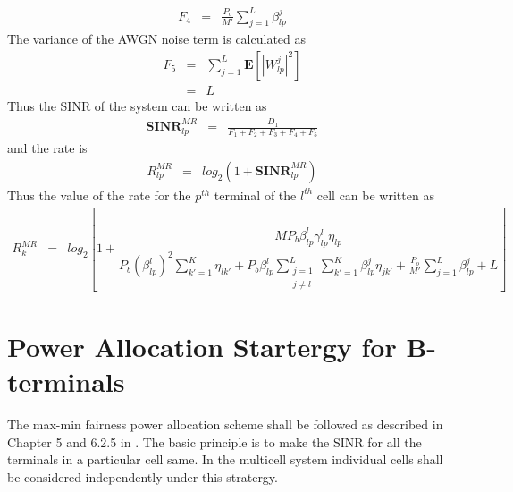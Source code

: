 \documentclass[10pt, a4paper, twoside,fleqn]{article}
\begin{document}
\begin{eqnarray}\label{eqn:noiseF4}
	F_4 &=& \frac{P_o}{M'}\sum_{j=1}^{L}\beta_{lp}^{j}
\end{eqnarray}
The variance of the AWGN noise term is calculated as 
\begin{eqnarray}\label{eqn:noiseF5}
	F_5 &=& \sum_{j=1}^{L} \mathbf{E}\left[|W_{lp}^{j}|^2\right] \nonumber \\
            &=& L
\end{eqnarray}
Thus the SINR of the system can be written as 
\begin{eqnarray}\label{eqn:sinrexp}
	\mathbf{SINR}_{lp}^{MR} &=& \frac{D_1}{F_1+F_2+F_3+F_4+F_5}
\end{eqnarray}
and the rate is 
\begin{eqnarray}\label{eqn:rateexp}
	R_{lp}^{MR} &=& log_2(1+\mathbf{SINR}_{lp}^{MR})
\end{eqnarray}
Thus the value of the rate for the $p^{th}$ terminal of the $l^{th}$ cell can be written as
\begin{eqnarray}\label{eqn:rateot}
	R_k^{MR} &=& log_2\left[1+ \dfrac{MP_b\beta_{lp}^{l}\gamma_{lp}^{l}\eta_{lp}}
                                         {P_b(\beta_{lp}^{l})^2\sum\limits_{k' = 1}^{K}\eta_{lk'}
                                                   +P_b\beta_{lp}^{l} \sum\limits_{\substack{j=1 \\ j \neq l}}^{L} \sum\limits_{k' = 1}^{K}\beta^{j}_{lp}\eta_{jk'}
						   +\frac{P_o}{M'} \sum\limits_{j=1}^{L}\beta_{lp}^{j}
						   +L}\right]
\end{eqnarray}

\section{Power Allocation Startergy for B-terminals}
  The max-min fairness power allocation scheme shall be followed as described in Chapter 5 and 6.2.5 in \cite{bib:MassiveMimoBook}. The basic principle is to make the SINR for all the terminals in a particular cell same. In the multicell system individual cells shall be considered independently under this stratergy. 
\end{document}
